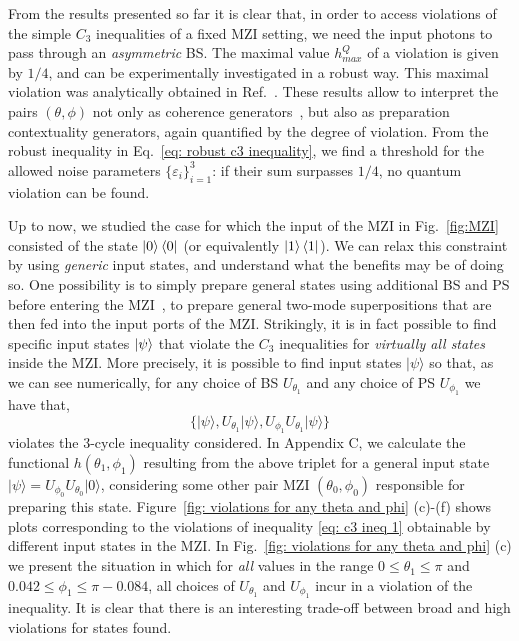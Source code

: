 \documentclass[a4paper,twocolumn,11pt,accepted=2024-01-17]{quantumarticle}
\begin{document}
From the results presented so far it is clear that, in order to access violations of the simple $C_3$ inequalities of a fixed MZI setting, we need the input photons to pass through an \textit{asymmetric} BS. The maximal value $h_{max}^Q$ of a violation is given by $1/4$, and can be experimentally investigated in a robust way. This maximal violation was analytically obtained in Ref.~\cite{galvaobroad2020quantumandclassical}. These results allow to interpret the pairs $(\theta,\phi)$ not only as coherence generators~\cite{ares2022beam}, but also as preparation contextuality generators, again quantified by the degree of violation. From the robust inequality in Eq.~\eqref{eq: robust c3 inequality}, we find a threshold for the allowed noise parameters $\{\varepsilon_i\}_{i=1}^3$: if their sum surpasses $1/4$, no quantum violation can be found.

Up to now, we studied the case for which the input of the MZI in Fig.~\ref{fig:MZI} consisted of the state $\ket{0}\bra{0}$ (or equivalently $\ket{1}\bra{1}$). We can relax this constraint by using \textit{generic} input states, and understand what the benefits may be of doing so. One possibility is to simply prepare general states using additional BS and PS before entering the MZI~\cite{chrysosthemos_quantum_2022}, to prepare general two-mode superpositions that are then fed into the input ports of the  MZI. Strikingly, it is in fact possible to find specific input states $\ket{\psi}$ that violate the $C_3$ inequalities for {\textit{virtually all states}} inside the  MZI. {More precisely, it is possible to find input states $\vert \psi \rangle$ so that, as we can see numerically, for any choice of BS $U_{\theta_1}$ and any choice of PS $U_{\phi_1}$ we have that,
\begin{equation*}
    \{\vert \psi \rangle, U_{\theta_1}\vert \psi \rangle, U_{\phi_1}U_{\theta_1}\vert \psi \rangle \}
\end{equation*}
violates the $3$-cycle inequality considered. In Appendix C, we calculate the functional $h(\theta_1,\phi_1)$ resulting from the above triplet for a general input state $\vert \psi \rangle = U_{\phi_0}U_{\theta_0}\vert 0\rangle$, considering some other pair MZI $(\theta_0,\phi_0)$ responsible for preparing this state.} Figure~\ref{fig: violations for any theta and phi} (c)-(f) shows plots corresponding to the violations of inequality \eqref{eq: c3 ineq 1} obtainable by different input states in the MZI. { In Fig.~\ref{fig: violations for any theta and phi} (c) we present the situation in which for \textit{all} values in the range $0 \leq \theta_1 \leq \pi$ and $0.042 \leq \phi_1 \leq \pi-0.084$, all choices of $U_{\theta_1}$ and $U_{\phi_1}$ incur in a violation of the inequality. }It is clear that there is an interesting trade-off between broad and high violations for states found. 
\end{document}
